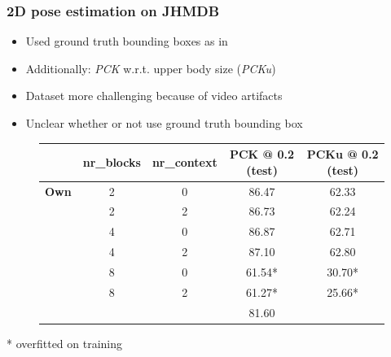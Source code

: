 \documentclass[9pt]{beamer}
\newenvironment{myframe}[1][]{%
\begin{frame}%
\frametitle{#1}
\setcounter{footnote}{0}


}{%
\end{frame}%
}
\begin{document}
\begin{myframe}[2D pose estimation on JHMDB]
    \begin{itemize}
        \item Used ground truth bounding boxes as in \footnotemark
        \item Additionally: \textit{PCK} w.r.t. upper body size (\textit{PCKu})
        \item Dataset more challenging because of video artifacts
        \item Unclear whether or not \footnotemark[2] use ground truth bounding box
    \end{itemize}
    \begin{figure}
        \begin{table}[]
            \small
            \begin{tabular}{|l|c|c|c|c|}
            \hline
             & \textbf{nr\_blocks} & \textbf{nr\_context} & \textbf{PCK @ 0.2 (test)} & \textbf{PCKu @ 0.2 (test)} \\ \hline
            \textbf{Own} & 2 & 0 & 86.47 & 62.33 \\
            \textbf{} & 2 & 2 & 86.73 & 62.24 \\
            \textbf{} & 4 & 0 & 86.87 &  62.71\\
            \textbf{} & 4 & 2 & 87.10 &  62.80 \\
            \textbf{} & 8 & 0 & 61.54* &  30.70* \\
            \textbf{} & 8 & 2 & 61.27* &  25.66*\\ \hline
            \textbf{\footnotemark} &  &  & 81.60 &  \\ \hline
            \end{tabular}
        \end{table}
    \end{figure}
    * overfitted on training
\end{myframe}
\end{document}
